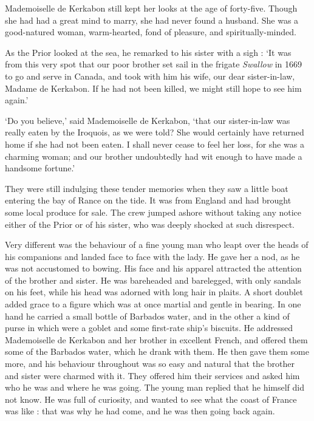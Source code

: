 \documentclass{article}
\begin{document}
\begin{center}
Mademoiselle de Kerkabon still kept her looks at the age of forty-five. Though 
she had had a great mind to marry, she had never found a husband. She was a good-natured 
woman, warm-hearted, fond of pleasure, and spiritually-minded. 

As the Prior looked at the sea, he remarked to his sister with a sigh : `It was 
from this very spot that our poor brother set sail in the frigate \textit{Swallow} 
in 1669 to go and serve in Canada, and took with him his wife, our dear sister-in-law, 
Madame de Kerkabon. If he had not been killed, we might still hope to see him again.' 

`Do you believe,' said Mademoiselle de Kerkabon, `that our sister-in-law was really 
eaten by the Iroquois, as we were told? She would certainly have returned home 
if she had not been eaten. I shall never cease to feel her loss, for she was a 
charming woman; and our brother undoubtedly had wit enough to have made a handsome 
fortune.' 

They were still indulging these tender memories when they saw a little boat entering 
the bay of Rance on the tide. It was from England and had brought some local produce 
for sale. The crew jumped ashore without taking any notice either of the Prior 
or of his sister, who was deeply shocked at such disrespect. 

Very different was the behaviour of a fine young man who leapt over the heads of 
his companions and landed face to face with the lady. He gave her a nod, as he 
was not accustomed to bowing. His face and his apparel attracted the attention 
of the brother and sister. He was bareheaded and barelegged, with only sandals 
on his feet, while his head was adorned with long hair in plaits. A short doublet 
added grace to a figure which was at once martial and gentle in bearing. In one 
hand he carried a small bottle of Barbados water, and in the other a kind of purse 
in which were a goblet and some first-rate ship's biscuits. He addressed Mademoiselle 
de Kerkabon and her brother in excellent French, and offered them some of the Barbados 
water, which he drank with them. He then gave them some more, and his behaviour 
throughout was so easy and natural that the brother and sister were charmed with 
it. They offered him their services and asked him who he was and where he was going. 
The young man replied that he himself did not know. He was full of curiosity, and 
wanted to see what the coast of France was like : that was why he had come, and 
he was then going back again. 


\end{center}
\end{document}

